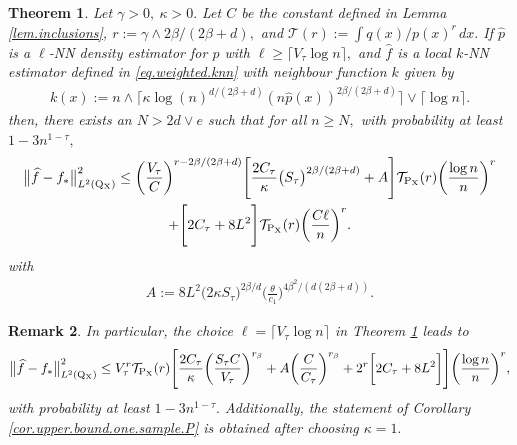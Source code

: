 \documentclass[10pt]{article}
\newcommand{\mT}{\mathcal{T}}
\renewcommand{\P}{\operatorname{P}}
\newcommand{\Q}{\operatorname{Q}}
\renewcommand{\k}{\kappa}
\newcommand{\wh}{\widehat}
\newcommand{\sX}{\mathrm{X}}
\newtheorem{theorem}{Theorem}
\newtheorem{remark}[theorem]{Remark}
\begin{document}
\begin{theorem}
    \label{th.transfer.local.knn.proof}
    Let $\gamma > 0, \ \kappa > 0.$ Let $C$ be the constant defined in Lemma \ref{lem.inclusions}, $r := \gamma\wedge 2\beta/(2\beta + d),$ and $\mT(r) := \int q(x)/p(x)^r\, dx.$ If $\wh p$ is a $\ell$-NN density estimator for $p$ with $\ell \geq \lceil V_\tau \log n\rceil,$ and $\wh f$ is a local $k$-NN estimator defined in \eqref{eq.weighted.knn} with neighbour function $k$ given by
    \begin{align*}
        k(x) := n\wedge \Big\lceil \kappa\log(n)^{d/(2\beta + d)}(n\wh p(x))^{2\beta/(2\beta + d)}\Big\rceil \vee \big\lceil \log n \big\rceil.
    \end{align*}
    then, there exists an $N > 2d\vee e$ such that for all $n \geq N,$ with probability at least $1 - 3n^{1- \tau},$
    \begin{multline*}
        \big\|\wh f - f_*\big\|_{L^2(\Q\mathstrut_{\!\sX})}^2 \leq \bigg(\frac{V_\tau}{C}\bigg)^{r - 2\beta/(2\beta +d)}\Bigg[\frac{2C_\tau}{\kappa}\big(S_\tau\big)^{2\beta/(2\beta + d)} + A\Bigg]\mT_{\P_{\sX}}(r)\bigg(\frac{\log n}{n}\bigg)^{r}\\
        + \Bigg[2C_\tau + 8L^2\Bigg]\mT_{\P_{\sX}}(r)\bigg(\frac{C\ell}{n}\bigg)^{r}.
    \end{multline*}
    with
    \begin{align*}
        A := 8L^2\big(2\k S_\tau\big)^{2\beta/d}\bigg(\frac{\theta}{c_1}\bigg)^{4\beta^2/(d(2\beta + d))}.
    \end{align*}
\end{theorem}

\begin{remark}
    In particular, the choice $\ell = \big\lceil V_\tau \log n\big\rceil$ in Theorem \ref{th.transfer.local.knn.proof} leads to
    \begin{align*}
        \big\|\wh f - f_*\big\|_{L^2(\Q\mathstrut_{\!\sX})}^2 \leq V_\tau^r\mT_{\P_{\sX}}(r)\Bigg[\frac{2C_\tau}{\kappa}\bigg(\frac{S_\tau C}{V_\tau}\bigg)^{r_\beta} + A\bigg(\frac{C}{C_\tau}\bigg)^{r_\beta} + 2^r\bigg[2C_\tau + 8L^2\bigg]\Bigg]\bigg(\frac{\log n}n\bigg)^{r},
    \end{align*}
    with probability at least $1 - 3n^{1-\tau}.$ Additionally, the statement of Corollary \ref{cor.upper.bound.one.sample.P} is obtained after choosing $\k = 1.$
\end{remark}
\end{document}
